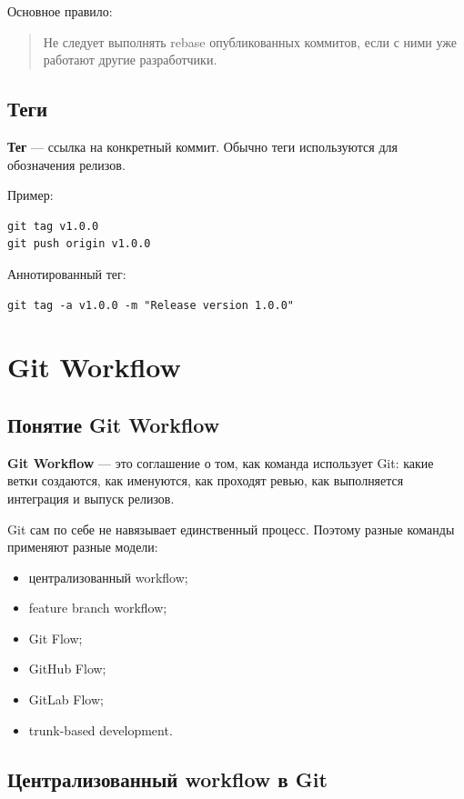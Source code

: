 \documentclass[12pt,a4paper]{article}
\begin{document}
Основное правило:

\begin{quote}
Не следует выполнять rebase опубликованных коммитов, если с ними уже работают другие разработчики.
\end{quote}

\subsection{Теги}

\textbf{Тег} --- ссылка на конкретный коммит. Обычно теги используются для обозначения релизов.

Пример:

\begin{lstlisting}
git tag v1.0.0
git push origin v1.0.0
\end{lstlisting}

Аннотированный тег:

\begin{lstlisting}
git tag -a v1.0.0 -m "Release version 1.0.0"
\end{lstlisting}

\section{Git Workflow}

\subsection{Понятие Git Workflow}

\textbf{Git Workflow} --- это соглашение о том, как команда использует Git: какие ветки создаются, как именуются, как проходят ревью, как выполняется интеграция и выпуск релизов.

Git сам по себе не навязывает единственный процесс. Поэтому разные команды применяют разные модели:

\begin{itemize}
    \item централизованный workflow;
    \item feature branch workflow;
    \item Git Flow;
    \item GitHub Flow;
    \item GitLab Flow;
    \item trunk-based development.
\end{itemize}

\subsection{Централизованный workflow в Git}
\end{document}

